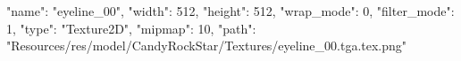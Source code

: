 {
  "name": "eyeline_00",
  "width": 512,
  "height": 512,
  "wrap_mode": 0,
  "filter_mode": 1,
  "type": "Texture2D",
  "mipmap": 10,
  "path": "Resources/res/model/CandyRockStar/Textures/eyeline_00.tga.tex.png"
}